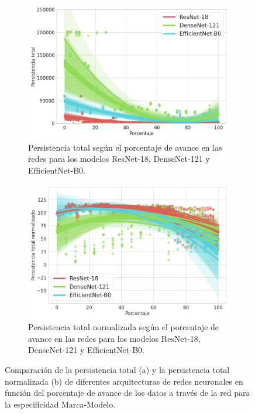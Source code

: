 \begin{figure}[H]
	\centering
	\begin{subfigure}
		{.5\textwidth}
		\centering
		\includegraphics[width=\linewidth]{img/m_arch.png}
		\caption{Persistencia total según el porcentaje de avance en las redes para
			los modelos ResNet-18, DenseNet-121 y EfficientNet-B0.}
		\label{fig:m-homology-arch-1}
	\end{subfigure}%
	\begin{subfigure}
		{.5\textwidth}
		\centering
		\includegraphics[width=\linewidth]{img/m_arch_norm.png}
		\caption{Persistencia total normalizada según el porcentaje de avance en las
			redes para los modelos ResNet-18, DenseNet-121 y EfficientNet-B0.}
		\label{fig:m-homology-arch-2}
	\end{subfigure}
	\caption{Comparación de la persistencia total (a) y la persistencia total
		normalizada (b) de diferentes arquitecturas de redes neuronales en función del
		porcentaje de avance de los datos a través de la red para la especificidad
		Marca-Modelo.}
	\label{fig:m-homology-arch}
\end{figure}

